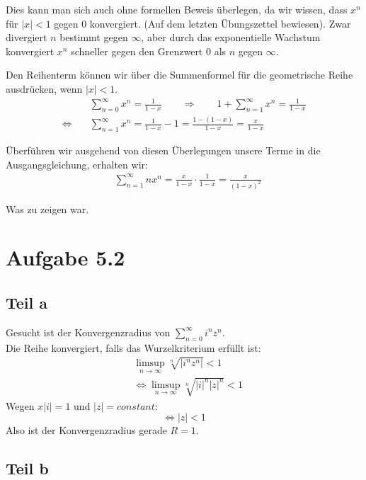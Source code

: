 \documentclass[a4paper,german,12pt,smallheadings]{scrartcl}
\begin{document}
Dies kann man sich auch ohne formellen Beweis überlegen, da wir wissen, dass
$x^n$ für $|x|<1$ gegen 0 konvergiert. (Auf dem letzten Übungszettel bewiesen).
Zwar divergiert $n$ bestimmt gegen $\infty$, aber durch das exponentielle
Wachstum konvergiert $x^n$ schneller gegen den Grenzwert 0 als $n$ gegen
$\infty$.

Den Reihenterm können wir über die Summenformel für die geometrische Reihe ausdrücken, wenn $|x| < 1$.
\begin{align*}
  &\sum_{n=0}^\infty x^n = \frac{1}{1-x} \qquad\Rightarrow\qquad 1 + \sum_{n=1}^\infty x^n= \frac{1}{1-x}\\ 
  \Leftrightarrow\quad & \sum_{n=1}^\infty x^n =\frac{1}{1-x} - 1 = \frac{1-\left(1-x\right)}{1-x}= \frac{x}{1-x}
\end{align*}


Überführen wir ausgehend von diesen Überlegungen unsere Terme in die Ausgangsgleichung, erhalten wir:
\begin{align*}
  &\sum_{n=1}^\infty nx^n = \frac{x}{1-x} \cdot \frac{1}{1-x} = \frac{x}{(1-x)^2}
\end{align*}

Was zu zeigen war.

\section*{Aufgabe 5.2}
\subsection*{Teil a}

Gesucht ist der Konvergenzradius von $\sum\limits_{n=0}^{\infty} i^nz^n$.\\
Die Reihe konvergiert, falls das Wurzelkriterium erfüllt ist:
\begin{align*}
  & \limsup\limits_{n \to \infty} \sqrt[n]{|i^nz^n|}<1\\
  & \Leftrightarrow \limsup\limits_{n \to \infty} \sqrt[n]{|i|^n|z|^n}<1
\end{align*}
Wegen $x|i|=1$ und $|z|=constant$:
\begin{equation*}
\Leftrightarrow |z|<1
\end{equation*}
Also ist der Konvergenzradius gerade $R=1$.

\subsection*{Teil b}
\end{document}
